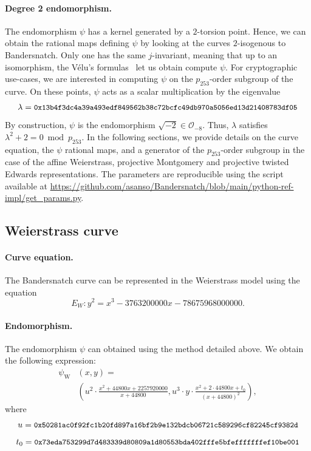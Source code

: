 \documentclass[smallextended]{svjour3}
\begin{document}
\paragraph{Degree 2 endomorphism.}
The endomorphism $\psi$ has a kernel generated by a $2$-torsion
point. Hence, we can obtain the rational maps defining $\psi$ by
looking at the curves $2$-isogenous to Bandersnatch. Only one has the
same $j$-invariant, meaning that up to an isomorphism, the Vélu's
formulas~\cite{velu71} let us obtain compute $\psi$.
For cryptographic use-cases, we are interested in computing $\psi$ on
the $p_{253}$-order subgroup of the curve. On these points, $\psi$
acts as a scalar multiplication by the eigenvalue
$$\lambda = \text{{\small{\tt
0x13b4f3dc4a39a493edf849562b38c72bcfc49db970a5056ed13d21408783df05}}}$$
By construction, $\psi$ is the endomorphism $\sqrt{-2}\in \mathcal
O_{-8}$. Thus, $\lambda$ satisfies
$\lambda^2+2 = 0 \bmod p_{253}$.
In the following sections, we provide details on the curve equation,
the $\psi$ rational maps, and a generator of the $p_{253}$-order
subgroup in the case of the affine Weierstrass, projective Montgomery
and projective twisted Edwards representations.
The parameters are reproducible using the script available at  \url{https://github.com/asanso/Bandersnatch/blob/main/python-ref-impl/get\_params.py}.

\subsection{Weierstrass curve}\label{sec-w-curve}
\paragraph{Curve equation.}
The Bandersnatch curve can be represented in the Weierstrass model
using the equation
$$E_W:y^2 = x^3 -3763200000x -78675968000000.$$

\paragraph{Endomorphism.}
The endomorphism $\psi$ can obtained using the method detailed above.
We obtain the following expression:
\begin{align*}
  \psi_\text{W}&(x,y) = \\
  &\left(u^2\cdot \frac{x^2+44800x+2257920000}{x+44800}, u^3\cdot
y\cdot \frac{x^2+2\cdot 44800x+t_0}{(x+44800)^2}\right),
\end{align*}
where
$$u = \text{{\small{\tt 0x50281ac0f92fc1b20fd897a16bf2b9e132bdcb06721c589296cf82245cf9382d}}}$$
$$t_0 = \text{{\small{\tt 0x73eda753299d7d483339d80809a1d80553bda402fffe5bfefffffffef10be001}}}$$
\end{document}
